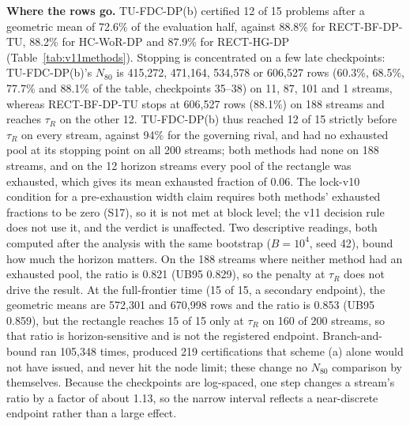 \documentclass[sigconf,anonymous,review]{acmart}
\begin{document}
\textbf{Where the rows go.} TU-FDC-DP(b) certified 12 of 15 problems after a geometric mean of 72.6\% of the evaluation half, against 88.8\% for RECT-BF-DP-TU, 88.2\% for HC-WoR-DP and 87.9\% for RECT-HG-DP (Table~\ref{tab:v11methods}). Stopping is concentrated on a few late checkpoints: TU-FDC-DP(b)'s $N_{80}$ is 415,272, 471,164, 534,578 or 606,527 rows (60.3\%, 68.5\%, 77.7\% and 88.1\% of the table, checkpoints 35--38) on 11, 87, 101 and 1 streams, whereas RECT-BF-DP-TU stops at 606,527 rows (88.1\%) on 188 streams and reaches $\tau_R$ on the other 12. TU-FDC-DP(b) thus reached 12 of 15 strictly before $\tau_R$ on every stream, against 94\% for the governing rival, and had no exhausted pool at its stopping point on all 200 streams; both methods had none on 188 streams, and on the 12 horizon streams every pool of the rectangle was exhausted, which gives its mean exhausted fraction of 0.06. The lock-v10 condition for a pre-exhaustion width claim requires both methods' exhausted fractions to be zero (S17), so it is not met at block level; the v11 decision rule does not use it, and the verdict is unaffected. Two descriptive readings, both computed after the analysis with the same bootstrap ($B = 10^4$, seed 42), bound how much the horizon matters. On the 188 streams where neither method had an exhausted pool, the ratio is 0.821 (UB95 0.829), so the penalty at $\tau_R$ does not drive the result. At the full-frontier time (15 of 15, a secondary endpoint), the geometric means are 572,301 and 670,998 rows and the ratio is 0.853 (UB95 0.859), but the rectangle reaches 15 of 15 only at $\tau_R$ on 160 of 200 streams, so that ratio is horizon-sensitive and is not the registered endpoint. Branch-and-bound ran 105,348 times, produced 219 certifications that scheme (a) alone would not have issued, and never hit the node limit; these change no $N_{80}$ comparison by themselves. Because the checkpoints are log-spaced, one step changes a stream's ratio by a factor of about 1.13, so the narrow interval reflects a near-discrete endpoint rather than a large effect.
\end{document}
